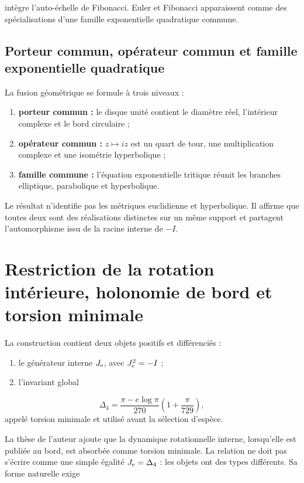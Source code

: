 intègre l’auto-échelle de Fibonacci. Euler et Fibonacci apparaissent comme des spécialisations d’une famille exponentielle quadratique commune.

\subsection{Porteur commun, opérateur commun et famille exponentielle quadratique}

La fusion géométrique se formule à trois niveaux :

\begin{enumerate}
\item \textbf{porteur commun :} le disque unité contient le diamètre réel, l’intérieur complexe et le bord circulaire ;
\item \textbf{opérateur commun :} \(z\mapsto iz\) est un quart de tour, une multiplication complexe et une isométrie hyperbolique ;
\item \textbf{famille commune :} l’équation exponentielle tritique réunit les branches elliptique, parabolique et hyperbolique.
\end{enumerate}

Le résultat n’identifie pas les métriques euclidienne et hyperbolique. Il affirme que toutes deux sont des réalisations distinctes sur un même support et partagent l’automorphisme issu de la racine interne de \(-I\).


\section{Restriction de la rotation intérieure, holonomie de bord et torsion minimale}

La construction contient deux objets positifs et différenciés :

\begin{enumerate}
\item le générateur interne \(J_{\rm e}\), avec \(J_{\rm e}^2=-I\) ;
\item l’invariant global
\end{enumerate}
   \[
   \Delta_4=
   \frac{\pi-e\log\pi}{270}
   \left(1+\frac{\pi}{729}\right),
   \]
   appelé torsion minimale et utilisé avant la sélection d’espèce.

La thèse de l’auteur ajoute que la dynamique rotationnelle interne, lorsqu’elle est publiée au bord, est absorbée comme torsion minimale. La relation ne doit pas s’écrire comme une simple égalité \(J_{\rm e}=\Delta_4\) : les objets ont des types différents. Sa forme naturelle exige

